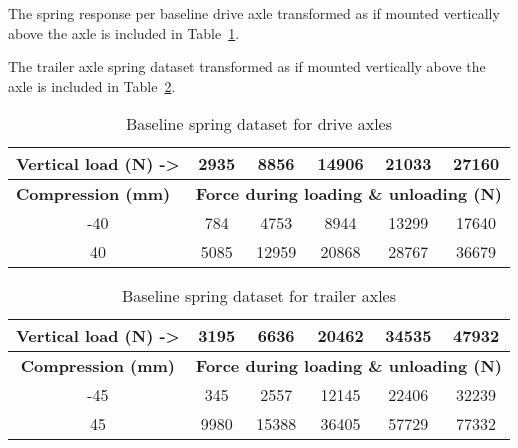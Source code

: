 The spring response per baseline drive axle transformed as if mounted vertically above the axle is included in Table~\ref{table:baseline-drive-axle-spring-response}.

The trailer axle spring dataset transformed as if mounted vertically above the axle is included in Table~\ref{table:baseline-trailer-axle-spring-response}.

\begin{table}[H]
  \centering\footnotesize
  \caption{Baseline spring dataset for drive axles}
    \begin{tabular}{|c|c|c|c|c|c|}
			\hline
			\multicolumn{1}{|l|}{\textbf{Vertical load (N) ->}} & 2935 & 8856 & 14906 & 21033 & 27160 \bigstrut\\
			\hline
			\multicolumn{1}{|l|}{\textbf{Compression (mm)}} & \multicolumn{5}{c|}{\textbf{Force during loading \& unloading (N)}} \bigstrut\\
			\hline
			-40 & 784 & 4753 & 8944 & 13299 & 17640 \bigstrut\\
			\hline
			40 & 5085 & 12959 & 20868 & 28767 & 36679 \bigstrut\\
			\hline
    \end{tabular}%
  \label{table:baseline-drive-axle-spring-response}%
\end{table}%


\begin{table}[H]
  \centering\footnotesize
  \caption{Baseline spring dataset for trailer axles}
    \begin{tabular}{|c|c|c|c|c|c|}
    \hline
    \multicolumn{1}{|c|}{\textbf{Vertical load (N) ->}} & 3195 & 6636 & 20462 & 34535 & 47932 \bigstrut\\
    \hline
    \multicolumn{1}{|c|}{\textbf{Compression (mm)}} & \multicolumn{5}{c|}{\textbf{Force during loading \& unloading (N)}} \bigstrut\\
    \hline
    -45 & 345 & 2557 & 12145 & 22406 & 32239 \bigstrut\\
    \hline
    45 & 9980 & 15388 & 36405 & 57729 & 77332 \bigstrut\\
    \hline
    \end{tabular}%
  \label{table:baseline-trailer-axle-spring-response}%
\end{table}%

